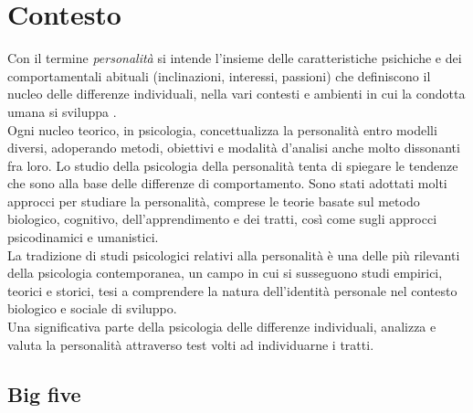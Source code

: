 \chapter{Contesto}
\label{chap:contesto}

Con il termine \emph{personalità} si intende l'insieme delle caratteristiche psichiche e dei comportamentali abituali (inclinazioni, interessi, passioni) che definiscono il nucleo delle differenze individuali, nella vari contesti e ambienti in cui la condotta umana si sviluppa \cite{corr2009cambridge,sadock2000comprehensive}.
\\
Ogni nucleo teorico, in psicologia, concettualizza la personalità entro modelli diversi, adoperando metodi, obiettivi e modalità d'analisi anche molto dissonanti fra loro. 
Lo studio della psicologia della personalità tenta di spiegare le tendenze che sono alla base delle differenze di comportamento. Sono stati adottati molti approcci per studiare la personalità, comprese le teorie basate sul metodo biologico, cognitivo, dell'apprendimento e dei tratti, così come sugli approcci psicodinamici e umanistici. 
\\
La tradizione di studi psicologici relativi alla personalità è una delle più rilevanti della psicologia contemporanea, un campo in cui si susseguono studi empirici, teorici e storici, tesi a comprendere la natura dell'identità personale nel contesto biologico e sociale di sviluppo. \\
Una significativa parte della psicologia delle differenze individuali, analizza e valuta la personalità attraverso test volti ad individuarne i tratti.

\section{Big five}
\label{sec:big5}

